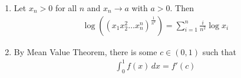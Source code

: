 \documentclass[a4paper,12pt]{article}
\theoremstyle{definition}
\begin{document}
\begin{enumerate}
\item Let $x_n >0$ for all $n$ and $x_n \to a$ with $a >0$. Then
\begin{align*}
\log \left((x_1x_2^2 \ldots x_n^n)^{\frac{1}{n^2}}\right) = \sum_{i=1}^{n}\frac{i}{n^2}\log x_i
\end{align*}

\item 

By Mean Value Theorem, there is some $c \in (0,1)$ such that
\begin{align*}
\int_{0}^{1}f(x)\,dx = f'(c)
\end{align*}	 		
\end{enumerate}
\end{document}
